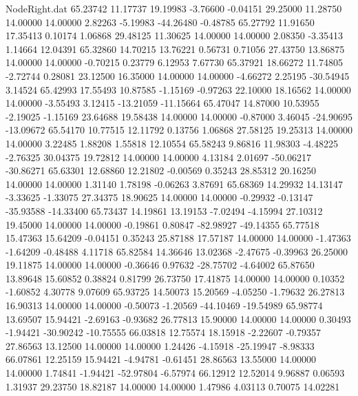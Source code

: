 \begin{filecontents}{NodeRight.dat}
  65.23742   11.17737   19.19983    -3.76600   -0.04151   29.25000   11.28750   14.00000   14.00000    2.82263   -5.19983  -44.26480   -0.48785
  65.27792   11.91650   17.35413     0.10174    1.06868   29.48125   11.30625   14.00000   14.00000    2.08350   -3.35413    1.14664   12.04391
  65.32860   14.70215   13.76221     0.56731    0.71056   27.43750   13.86875   14.00000   14.00000   -0.70215    0.23779    6.12953    7.67730
  65.37921   18.66272   11.74805    -2.72744    0.28081   23.12500   16.35000   14.00000   14.00000   -4.66272    2.25195  -30.54945    3.14524
  65.42993   17.55493   10.87585    -1.15169   -0.97263   22.10000   18.16562   14.00000   14.00000   -3.55493    3.12415  -13.21059  -11.15664
  65.47047   14.87000   10.53955    -2.19025   -1.15169   23.64688   19.58438   14.00000   14.00000   -0.87000    3.46045  -24.90695  -13.09672
  65.54170   10.77515   12.11792     0.13756    1.06868   27.58125   19.25313   14.00000   14.00000    3.22485    1.88208    1.55818   12.10554
  65.58243    9.86816   11.98303    -4.48225   -2.76325   30.04375   19.72812   14.00000   14.00000    4.13184    2.01697  -50.06217  -30.86271
  65.63301   12.68860   12.21802    -0.00569    0.35243   28.85312   20.16250   14.00000   14.00000    1.31140    1.78198   -0.06263    3.87691
  65.68369   14.29932   14.13147    -3.33625   -1.33075   27.34375   18.90625   14.00000   14.00000   -0.29932   -0.13147  -35.93588  -14.33400
  65.73437   14.19861   13.19153    -7.02494   -4.15994   27.10312   19.45000   14.00000   14.00000   -0.19861    0.80847  -82.98927  -49.14355
  65.77518   15.47363   15.64209    -0.04151    0.35243   25.87188   17.57187   14.00000   14.00000   -1.47363   -1.64209   -0.48488    4.11718
  65.82584   14.36646   13.02368    -2.47675   -0.39963   26.25000   19.11875   14.00000   14.00000   -0.36646    0.97632  -28.75702   -4.64002
  65.87650   13.89648   15.60852     0.38824    0.81799   26.73750   17.41875   14.00000   14.00000    0.10352   -1.60852    4.30778    9.07609
  65.93725   14.50073   15.20569    -4.05250   -1.79632   26.27813   16.90313   14.00000   14.00000   -0.50073   -1.20569  -44.10469  -19.54989
  65.98774   13.69507   15.94421    -2.69163   -0.93682   26.77813   15.90000   14.00000   14.00000    0.30493   -1.94421  -30.90242  -10.75555
  66.03818   12.75574   18.15918    -2.22607   -0.79357   27.86563   13.12500   14.00000   14.00000    1.24426   -4.15918  -25.19947   -8.98333
  66.07861   12.25159   15.94421    -4.94781   -0.61451   28.86563   13.55000   14.00000   14.00000    1.74841   -1.94421  -52.97804   -6.57974
  66.12912   12.52014    9.96887     0.06593    1.31937   29.23750   18.82187   14.00000   14.00000    1.47986    4.03113    0.70075   14.02281

\end{filecontents}
